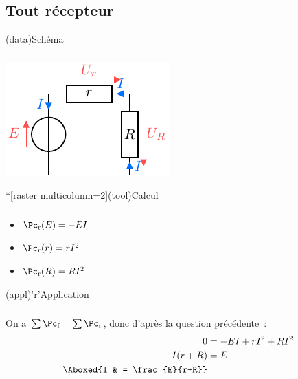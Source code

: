\documentclass[../../main/main.tex]{subfiles}
\begin{document}
{\subsection{Tout récepteur}
\begin{tcbraster}[raster columns=7, raster equal height=rows]
    \begin{tcb}[raster multicolumn=2](data){Schéma}
        \subsubsection{}
        \vfill
        \begin{center}
            \includegraphics{convs_a}
        \end{center}
        \vfill
    \end{tcb}
    \begin{tcb}*[raster multicolumn=2](tool){Calcul}
        \subsubsection{}
        \vfill
        \begin{itemize}[leftmargin=20pt]
            \item $\Pc_{\text{r}}(E) = -EI$
            \item $\Pc_{\text{r}}(r) = rI^2$
            \item $\Pc_{\text{r}}(R) = RI^2$
        \end{itemize}
        \vfill
    \end{tcb}
    \begin{tcb}[raster multicolumn=3](appl)'r'{Application}
        \subsubsection{}
        On a $\sum \Pc_{\text{f}} = \sum \Pc_{\text{r}}$, donc d'après
        la question précédente~:
        \begin{align*}
            0         & = -EI + rI^2 + RI^2\\
            I(r+R)    & = E\\
            \Aboxed{I & = \frac{E}{r+R}}
        \end{align*}
    \end{tcb}
\end{tcbraster}

}
\end{document}
